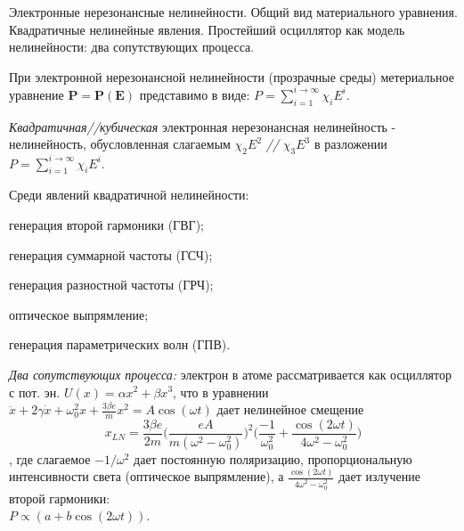 
\begin{leftrules}
Электронные нерезонансные нелинейности. Общий вид материального уравнения. Квадратичные нелинейные явления. Простейший осциллятор как модель нелинейности: два сопутствующих процесса.
\end{leftrules}



При электронной нерезонансной нелинейности (прозрачные среды) метериальное уравнение $\mathbf{P}=\mathbf{P}(\mathbf{E})$ представимо в виде: $P=\sum\limits_{i=1}^{i \to \infty} \chi_{i} E^{i}$.

\begin{to_def}
    \textit{Квадратичная//кубическая} электронная нерезонансная нелинейность - нелинейность, обусловленная слагаемым $\chi_{2} E^{2}$ \textit{//} $\chi_{3} E^{3}$ в разложении $P=\sum\limits_{i=1}^{i \to \infty} \chi_{i} E^{i}$.
\end{to_def}

Среди явлений квадратичной нелинейности: 
\begin{enumerate*}
    \item генерация второй гармоники (ГВГ); 
    \item генерация суммарной частоты (ГСЧ); 
    \item генерация разностной частоты (ГРЧ); 
    \item оптическое выпрямление; 
    \item генерация параметрических волн (ГПВ).
\end{enumerate*}


\textit{Два сопутствующих процесса:} электрон в атоме рассматривается как осциллятор с пот. эн. $U(x)=\alpha x^{2} + \beta x^{3}$, что в уравнении $\ddot{x} + 2\gamma \dot{x} + \omega_{0}^{2} x + \frac{3\beta e}{m} x^{2} = A \cos(\omega t)$ дает нелинейное смещение
\begin{equation*}
    x_{LN} = \frac{3\beta e}{2m} \Big( \frac{eA}{m(\omega^{2}-\omega_{0}^{2})} \Big)^{2} \Big( \frac{-1}{\omega_{0}^{2}} + \frac{ \cos(2\omega t)}{4\omega^{2}-\omega_{0}^{2}} \Big)
\end{equation*}
, где слагаемое $-1/\omega^{2}$ дает постоянную поляризацию, пропорциональную интенсивности света (оптическое выпрямление), а $\frac{ \cos(2\omega t)}{4\omega^{2}-\omega_{0}^{2}}$ дает излучение второй гармоники: \\ $P \propto (a+b \cos(2\omega t))$.
